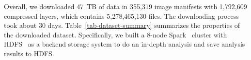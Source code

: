 %
Overall, we downloaded 47~TB of data in 355,319 image manifests with 1,792,609
compressed layers, which contains 5,278,465,130 files. 
The downloading process took about 30 days.
%
%
Table~\ref{tab-dataset-summary} summarizes the properties of the downloaded
dataset.
%
%
Specifically, we built a 8-node Spark~\cite{xxx} cluster with HDFS~\cite{xxx} as a backend storage system
to do an in-depth analysis and save analysis results to HDFS.

